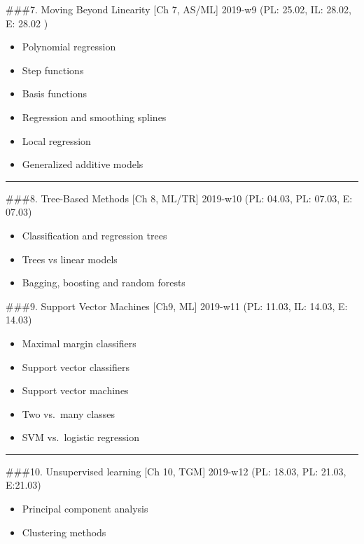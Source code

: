 \documentclass[]{article}
\providecommand{\tightlist}{%
  \setlength{\itemsep}{0pt}\setlength{\parskip}{0pt}}
\begin{document}
\#\#\#7. Moving Beyond Linearity {[}Ch 7, AS/ML{]} 2019-w9 (PL: 25.02,
IL: 28.02, E: 28.02 )

\begin{itemize}
\tightlist
\item
  Polynomial regression
\item
  Step functions
\item
  Basis functions
\item
  Regression and smoothing splines
\item
  Local regression
\item
  Generalized additive models
\end{itemize}

\begin{center}\rule{0.5\linewidth}{\linethickness}\end{center}

\#\#\#8. Tree-Based Methods {[}Ch 8, ML/TR{]} 2019-w10 (PL: 04.03, PL:
07.03, E: 07.03)

\begin{itemize}
\tightlist
\item
  Classification and regression trees
\item
  Trees vs linear models
\item
  Bagging, boosting and random forests
\end{itemize}

\#\#\#9. Support Vector Machines {[}Ch9, ML{]} 2019-w11 (PL: 11.03, IL:
14.03, E: 14.03)

\begin{itemize}
\tightlist
\item
  Maximal margin classifiers
\item
  Support vector classifiers
\item
  Support vector machines
\item
  Two vs.~many classes
\item
  SVM vs.~logistic regression
\end{itemize}

\begin{center}\rule{0.5\linewidth}{\linethickness}\end{center}

\#\#\#10. Unsupervised learning {[}Ch 10, TGM{]} 2019-w12 (PL: 18.03,
PL: 21.03, E:21.03)

\begin{itemize}
\tightlist
\item
  Principal component analysis
\item
  Clustering methods
\end{itemize}
\end{document}
